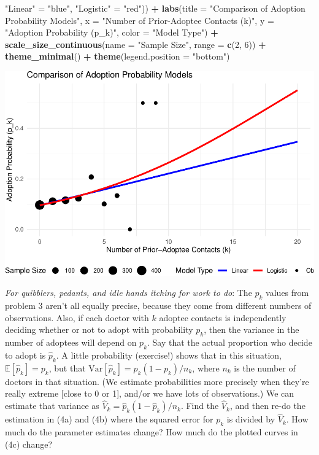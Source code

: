 \documentclass[
]{article}
\newenvironment{Shaded}{\begin{snugshade}}{\end{snugshade}}
\newcommand{\AttributeTok}[1]{\textcolor[rgb]{0.13,0.29,0.53}{#1}}
\newcommand{\DecValTok}[1]{\textcolor[rgb]{0.00,0.00,0.81}{#1}}
\newcommand{\FunctionTok}[1]{\textcolor[rgb]{0.13,0.29,0.53}{\textbf{#1}}}
\newcommand{\NormalTok}[1]{#1}
\newcommand{\OtherTok}[1]{\textcolor[rgb]{0.56,0.35,0.01}{#1}}
\newcommand{\SpecialCharTok}[1]{\textcolor[rgb]{0.81,0.36,0.00}{\textbf{#1}}}
\newcommand{\StringTok}[1]{\textcolor[rgb]{0.31,0.60,0.02}{#1}}
\begin{document}
\begin{Shaded}
\begin{Highlighting}[]
\StringTok{"Linear"} \OtherTok{=} \StringTok{"blue"}\NormalTok{,}
\StringTok{"Logistic"} \OtherTok{=} \StringTok{"red"}\NormalTok{)) }\SpecialCharTok{+}
\FunctionTok{labs}\NormalTok{(}\AttributeTok{title =} \StringTok{"Comparison of Adoption Probability Models"}\NormalTok{,}
\AttributeTok{x =} \StringTok{"Number of Prior{-}Adoptee Contacts (k)"}\NormalTok{,}
\AttributeTok{y =} \StringTok{"Adoption Probability (p\_k)"}\NormalTok{,}
\AttributeTok{color =} \StringTok{"Model Type"}\NormalTok{) }\SpecialCharTok{+}
\FunctionTok{scale\_size\_continuous}\NormalTok{(}\AttributeTok{name =} \StringTok{"Sample Size"}\NormalTok{, }\AttributeTok{range =} \FunctionTok{c}\NormalTok{(}\DecValTok{2}\NormalTok{, }\DecValTok{6}\NormalTok{)) }\SpecialCharTok{+}
\FunctionTok{theme\_minimal}\NormalTok{() }\SpecialCharTok{+}
\FunctionTok{theme}\NormalTok{(}\AttributeTok{legend.position =} \StringTok{"bottom"}\NormalTok{)}
\end{Highlighting}
\end{Shaded}

\includegraphics{Homework-04_files/figure-latex/unnamed-chunk-7-1.pdf}

\emph{For quibblers, pedants, and idle hands itching for work to do}:
The \(p_k\) values from problem 3 aren't all equally precise, because
they come from different numbers of observations. Also, if each doctor
with \(k\) adoptee contacts is independently deciding whether or not to
adopt with probability \(p_k\), then the variance in the number of
adoptees will depend on \(p_k\). Say that the actual proportion who
decide to adopt is \(\hat{p}_k\). A little probability (exercise!) shows
that in this situation, \(\mathbb{E}[\hat{p}_k] = p_k\), but that
\(\mathrm{Var}[\hat{p}_k] = p_k(1-p_k)/n_k\), where \(n_k\) is the
number of doctors in that situation. (We estimate probabilities more
precisely when they're really extreme {[}close to 0 or 1{]}, and/or we
have lots of observations.) We can estimate that variance as
\(\hat{V}_k = \hat{p}_k(1-\hat{p}_k)/n_k\). Find the \(\hat{V}_k\), and
then re-do the estimation in (4a) and (4b) where the squared error for
\(p_k\) is divided by \(\hat{V}_k\). How much do the parameter estimates
change? How much do the plotted curves in (4c) change?
\end{document}
